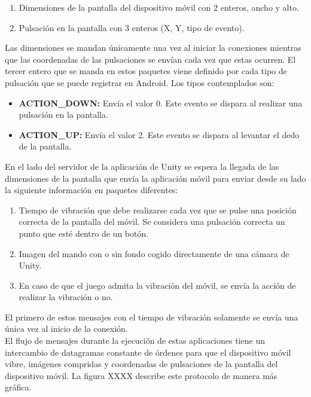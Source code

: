 \begin{enumerate}

\item Dimensiones de la pantalla del dispositivo m\'ovil con 2 enteros, ancho y alto.
\item Pulsaci\'on en la pantalla con 3 enteros (X, Y, tipo de evento). 

\end{enumerate}

Las dimensiones se mandan \'unicamente una vez al iniciar la conexiones mientras que las coordenadas de las pulsaciones se env\'ian cada vez que estas ocurren. El tercer entero que se manda en estos paquetes viene definido por cada tipo de pulsaci\'on que se puede registrar en Android. Los tipos contemplados son:
\begin{itemize} 
\item \textbf{ACTION\_DOWN:} Env\'ia el valor 0. Este evento se dispara al realizar una pulsaci\'on en la pantalla.
\item \textbf{ACTION\_UP:} Env\'ia el valor 2. Este evento se dispara al levantar el dedo de la pantalla.
\end{itemize}

En el lado del servidor de la aplicaci\'on de Unity se espera la llegada de las dimensiones de la pantalla que env\'ia la aplicaci\'on m\'ovil para enviar desde su lado la siguiente informaci\'on en paquetes diferentes:

\begin{enumerate}
\item Tiempo de vibraci\'on que debe realizarse cada vez que se pulse una posici\'on correcta de la pantalla del m\'ovil. Se considera una pulsaci\'on correcta un punto que est\'e dentro de un bot\'on.
\item Imagen del mando con o sin fondo cogido directamente de una c\'amara de Unity.
\item En caso de que el juego admita la vibraci\'on del m\'ovil, se env\'ia la acci\'on de realizar la vibraci\'on o no.
\end {enumerate}

El primero de estos mensajes con el tiempo de vibraci\'on solamente se env\'ia una \'unica vez al inicio de la conexi\'on.
\\
El flujo de mensajes durante la ejecuci\'on de estas aplicaciones tiene un intercambio de datagramas constante de \'ordenes para que el dispositivo m\'ovil vibre, im\'agenes compridas y coordenadas de pulsaciones de la pantalla del dispositivo m\'ovil.
La figura XXXX describe este protocolo de manera m\'as gr\'afica.

